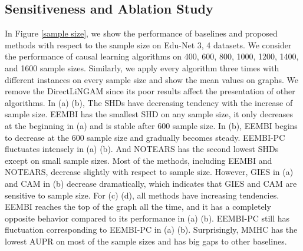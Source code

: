 \documentclass[twoside,11pt]{article}
\begin{document}
\subsection{Sensitiveness and Ablation Study}


\begin{figure*}[htbp]
\centering



\caption{The change of SHD and AUPR of causal structure learning algorithms with respect to sample size on Education 3, 4. (a) (b) show the SHD with respect to sample size and (c) (d) show the AUPR with respect to sample size.}\label{sample size}
\end{figure*}


In Figure \ref{sample size}, we show the performance of baselines and proposed methods with respect to the sample size on Edu-Net 3, 4 datasets. We consider the performance of causal learning algorithms on 400, 600, 800, 1000, 1200, 1400, and 1600 sample sizes. Similarly, we apply every algorithm three times with different instances on every sample size and show the mean values on graphs. We remove the DirectLiNGAM since its poor results affect the presentation of other algorithms. In (a) (b), The SHDs have decreasing tendency with the increase of sample size. EEMBI has the smallest SHD on any sample size, it only decreases at the beginning in (a) and is stable after 600 sample size. In (b), EEMBI begins to decrease at the 600 sample size and gradually becomes steady. EEMBI-PC fluctuates intensely in (a) (b). And NOTEARS has the second lowest SHDs except on small sample sizes. Most of the methods, including EEMBI and NOTEARS, decrease slightly with respect to sample size. However, GIES in (a) and CAM in (b) decrease dramatically, which indicates that GIES and CAM are sensitive to sample size. For (c) (d), all methods have increasing tendencies. EEMBI reaches the top of the graph all the time, and it has a completely opposite behavior compared to its performance in (a) (b). EEMBI-PC still has fluctuation corresponding to EEMBI-PC in (a) (b). Surprisingly, MMHC has the lowest AUPR on most of the sample sizes and has big gaps to other baselines.
\end{document}
